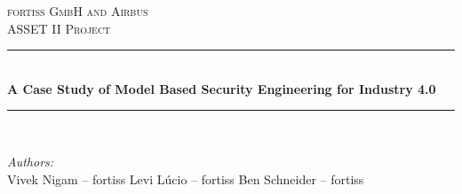 \begin{titlepage}

\newcommand{\HRule}{\rule{\linewidth}{0.5mm}} %

\center %
 

\textsc{\LARGE fortiss GmbH and Airbus}\\[1.5cm] %
\textsc{\Large ASSET II Project}\\[0.5cm] %


\HRule \\[0.4cm]
{ \huge \bfseries A Case Study of Model Based Security Engineering for Industry 4.0}\\[0.4cm] %
\HRule \\[1cm]
 

\begin{minipage}{0.5\textwidth}
\begin{flushleft} \large
\emph{Authors:}\\
Vivek {Nigam} -- fortiss \qquad%
\qquad Levi L\'ucio -- fortiss \qquad \qquad
\qquad Ben Schneider -- fortiss 
\end{flushleft}
\end{minipage}
~
\begin{minipage}{0.4\textwidth}
\end{minipage}\\[1cm]



\end{titlepage}
